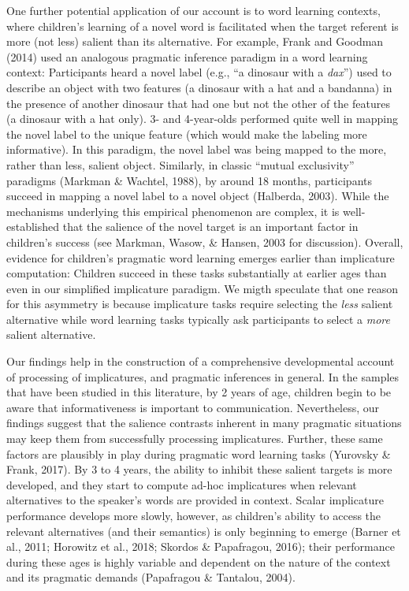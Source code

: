 \documentclass[man]{apa6}
\theoremstyle{definition}
\theoremstyle{definition}
\theoremstyle{definition}
\theoremstyle{remark}
\begin{document}
One further potential application of our account is to word learning
contexts, where children's learning of a novel word is facilitated when
the target referent is more (not less) salient than its alternative. For
example, Frank and Goodman (2014) used an analogous pragmatic inference
paradigm in a word learning context: Participants heard a novel label
(e.g., \enquote{a dinosaur with a \emph{dax}}) used to describe an
object with two features (a dinosaur with a hat and a bandanna) in the
presence of another dinosaur that had one but not the other of the
features (a dinosaur with a hat only). 3- and 4-year-olds performed
quite well in mapping the novel label to the unique feature (which would
make the labeling more informative). In this paradigm, the novel label
was being mapped to the more, rather than less, salient object.
Similarly, in classic \enquote{mutual exclusivity} paradigms (Markman \&
Wachtel, 1988), by around 18 months, participants succeed in mapping a
novel label to a novel object (Halberda, 2003). While the mechanisms
underlying this empirical phenomenon are complex, it is well-established
that the salience of the novel target is an important factor in
children's success (see Markman, Wasow, \& Hansen, 2003 for discussion).
Overall, evidence for children's pragmatic word learning emerges earlier
than implicature computation: Children succeed in these tasks
substantially at earlier ages than even in our simplified implicature
paradigm. We migth speculate that one reason for this asymmetry is
because implicature tasks require selecting the \emph{less} salient
alternative while word learning tasks typically ask participants to
select a \emph{more} salient alternative.

Our findings help in the construction of a comprehensive developmental
account of processing of implicatures, and pragmatic inferences in
general. In the samples that have been studied in this literature, by 2
years of age, children begin to be aware that informativeness is
important to communication. Nevertheless, our findings suggest that the
salience contrasts inherent in many pragmatic situations may keep them
from successfully processing implicatures. Further, these same factors
are plausibly in play during pragmatic word learning tasks (Yurovsky \&
Frank, 2017). By 3 to 4 years, the ability to inhibit these salient
targets is more developed, and they start to compute ad-hoc implicatures
when relevant alternatives to the speaker's words are provided in
context. Scalar implicature performance develops more slowly, however,
as children's ability to access the relevant alternatives (and their
semantics) is only beginning to emerge (Barner et al., 2011; Horowitz et
al., 2018; Skordos \& Papafragou, 2016); their performance during these
ages is highly variable and dependent on the nature of the context and
its pragmatic demands (Papafragou \& Tantalou, 2004).
\end{document}
